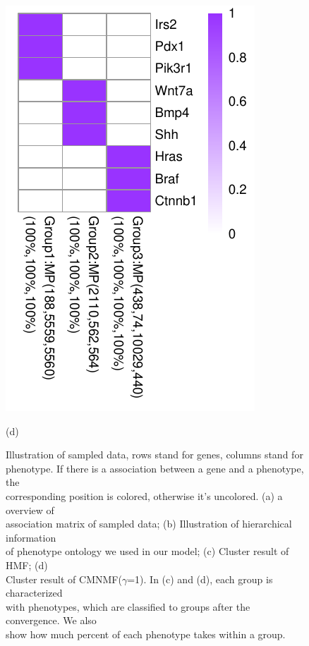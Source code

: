 \documentclass{bmcart}
\begin{document}
\begin{figure}[!h]
\begin{minipage}{.38\linewidth}
   \includegraphics[width=\linewidth]{DrawPictures/v4.pdf}
    \centerline{(d)}
  \end{minipage}
  \caption{Illustration of sampled data, rows stand for genes, columns stand for \protect\\
  phenotype. If there is a association between a gene and a phenotype, the \protect \\
  corresponding position is colored, otherwise it's uncolored. (a) a overview of \protect \\
  association matrix of sampled data; (b) Illustration of hierarchical information \protect \\
  of phenotype ontology we used in our model; (c) Cluster result of HMF; (d)\protect \\
  Cluster result of CMNMF($\gamma$=1). In (c) and (d), each group is characterized \protect \\
  with phenotypes, which are classified to groups after the convergence. We also \protect \\
  show how much percent of each phenotype takes within a group.}
  \label{fig:sampled_result}
\end{figure}
\end{document}
